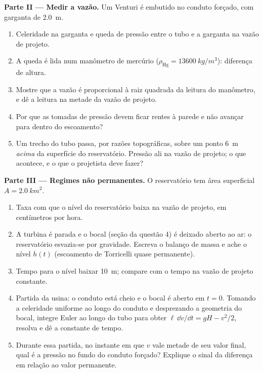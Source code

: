 \begin{problem}
\medskip
\noindent\textbf{Parte II --- Medir a vazão.}
Um Venturi é embutido no conduto forçado, com garganta de \qty{2.0}{m}.
\begin{enumerate}[resume]
  \item Celeridade na garganta e queda de pressão entre o tubo e a
        garganta na vazão de projeto.
  \item A queda é lida num manômetro de mercúrio ($\rho_{\text{Hg}} =
        \qty{13600}{kg/m^3}$): diferença de altura.
  \item Mostre que a vazão é proporcional à raiz quadrada da
        leitura do manômetro, e dê a leitura na metade da vazão
        de projeto.
  \item Por que as tomadas de pressão devem ficar rentes à parede e não
        avançar para dentro do escoamento?
  \item Um trecho do tubo passa, por razões topográficas, sobre um
        ponto \qty{6}{m} \emph{acima} da superfície do reservatório. Pressão ali
        na vazão de projeto; o que acontece, e o que o projetista deve fazer?
\end{enumerate}

\medskip
\noindent\textbf{Parte III --- Regimes não permanentes.}
O reservatório tem área superficial $A = \qty{2.0}{km^2}$.
\begin{enumerate}[resume]
  \item Taxa com que o nível do reservatório baixa na vazão de projeto, em
        centímetros por hora.
  \item A turbina é parada e o bocal (seção da questão 4)
        é deixado aberto ao ar: o reservatório esvazia-se por gravidade. Escreva
        o balanço de massa e ache o nível $h(t)$ (escoamento de
        Torricelli quase permanente).
  \item Tempo para o nível baixar \qty{10}{m}; compare com o tempo
        na vazão de projeto constante.
  \item Partida da usina: o conduto está cheio e o bocal é aberto
        em $t = 0$. Tomando a celeridade uniforme ao longo do conduto e
        desprezando a geometria do bocal, integre Euler ao longo do
        tubo para obter $\ell\,\dd v/\dd t = gH - v^2/2$, resolva e dê
        a constante de tempo.
  \item Durante essa partida, no instante em que $v$ vale metade de seu valor
        final, qual é a pressão no fundo do conduto forçado?
        Explique o sinal da diferença em relação ao valor permanente.
\end{enumerate}


\end{problem}
